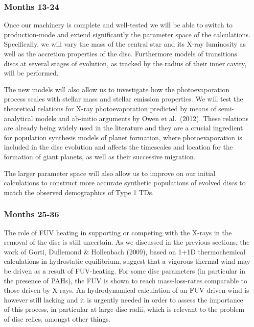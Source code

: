 \documentclass[10pt,fleqn,twoside]{article}
\begin{document}
\subsubsection{Months 13-24}

Once our machinery is complete and well-tested we will be able to
switch to production-mode and extend significantly the parameter space
of the calculations. Specifically, we will vary the mass of the central star and its X-ray
luminosity as well as the accretion properties of the
disc. Furthermore models of transitions discs at several stages 
of evolution, as tracked by the radius of their inner cavity, will be
performed. 


The new models will also allow us to investigate how
the photoevaporation process scales with stellar mass and stellar emission
properties. We will test the theoretical relations for X-ray photoevaporation 
predicted by means of semi-analytical models and ab-initio arguments
by Owen et al.\ (2012). These relations are already being widely used in
the literature and they are a crucial ingredient for population
synthesis models of planet formation, where photoevaporation is
included in the disc evolution and affects the timescales and location for
the formation of giant planets, as well as their successive
migration. 

The larger parameter space will also allow us to improve on our
initial calculations to construct more accurate synthetic
populations of evolved discs to match
the observed demographics of Type 1 TDs.  \\

\subsubsection{Months 25-36} 
The role of FUV heating in supporting or competing with the X-rays in
the removal of the disc is still uncertain. As we discussed in the
previous sections, the work of Gorti, Dullemond \& Hollenbach
(2009), based on 1+1D thermochemical calculations in hydrostatic
equilibrium, suggest that a vigorous thermal wind may be driven as a
result of FUV-heating. For some disc parameters (in particular in the
presence of PAHs), the FUV is shown to reach mass-loss-rates
comparable to those driven by X-rays. An hydrodynamical calculation of
an FUV driven wind is however still lacking and it is urgently needed
in order to assess the importance of this process, in particular at
large disc radii, which is relevant to the problem of disc relics,
amongst other things. 
\end{document}
